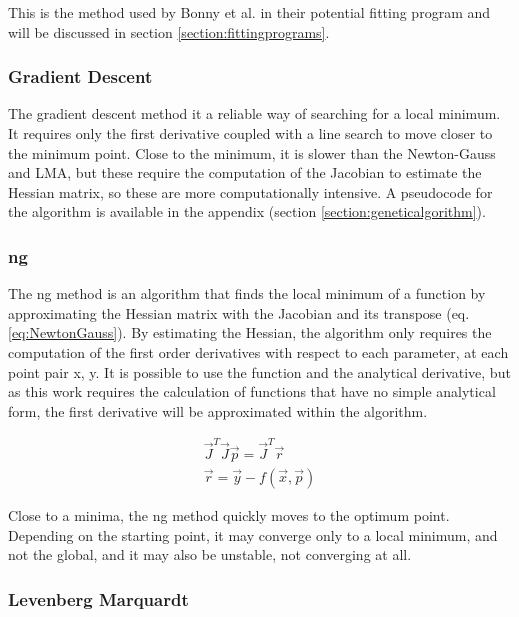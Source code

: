 This is the method used by Bonny et al. in their potential fitting program and will be discussed in section \ref{section:fittingprograms}.


\subsubsection{Gradient Descent}

The gradient descent method it a reliable way of searching for a local minimum.  It requires only the first derivative coupled with a line search to move closer to the minimum point.  Close to the minimum, it is slower than the Newton-Gauss and LMA, but these require the computation of the Jacobian to estimate the Hessian matrix, so these are more computationally intensive.  A pseudocode for the algorithm is available in the appendix (section \ref{section:geneticalgorithm}).


\subsubsection{\acrlong{ng}}

The \acrlong{ng} method is an algorithm that finds the local minimum of a function by approximating the Hessian matrix with the Jacobian and its transpose (eq. \ref{eq:NewtonGauss}).  By estimating the Hessian, the algorithm only requires the computation of the first order derivatives with respect to each parameter, at each point pair x, y.  It is possible to use the function and the analytical derivative, but as this work requires the calculation of functions that have no simple analytical form, the first derivative will be approximated within the algorithm.

\begin{equation}
  \begin{split}
    \vec{J}^{T} \vec{J} \vec{p} = \vec{J}^{T} \vec{r} \\
    \vec{r} = \vec{y} - f(\vec{x}, \vec{p})
  \end{split}
  \label{eq:NewtonGauss}
\end{equation}

Close to a minima, the \acrshort{ng} method quickly moves to the optimum point.  Depending on the starting point, it may converge only to a local minimum, and not the global, and it may also be unstable, not converging at all.




\subsubsection{Levenberg Marquardt}


